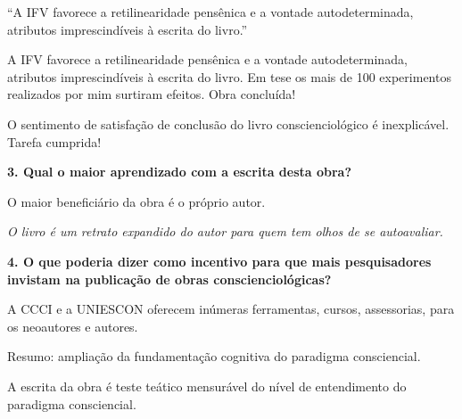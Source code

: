 \documentclass{gescons}
\begin{document}
\begin{multicols}{2}
\begin{pullquote}
``A IFV favorece a retilinearidade pensênica e a vontade autodeterminada, atributos imprescindíveis à escrita do livro.''
\end{pullquote}

A IFV favorece a retilinearidade pensênica e a vontade autodeterminada, atributos imprescindíveis à escrita do livro. Em tese os mais de 100 experimentos realizados por mim surtiram efeitos. Obra concluída!

O sentimento de satisfação de conclusão do livro conscienciológico é inexplicável. Tarefa cumprida!

\textbf{3. Qual o maior aprendizado com a escrita desta obra?}

O maior beneficiário da obra é o próprio autor.

\emph{O livro é um retrato expandido do autor para quem tem olhos de se autoavaliar.}


\textbf{4. O que poderia dizer como incentivo para que mais pesquisadores invistam na publicação de obras conscienciológicas?}

A CCCI e a UNIESCON oferecem inúmeras ferramentas, cursos, assessorias, para os neoautores e autores.

Resumo: ampliação da fundamentação cognitiva do paradigma consciencial.

A escrita da obra é teste teático mensurável do nível de entendimento do paradigma consciencial.


    
    \end{multicols}
\end{document}

